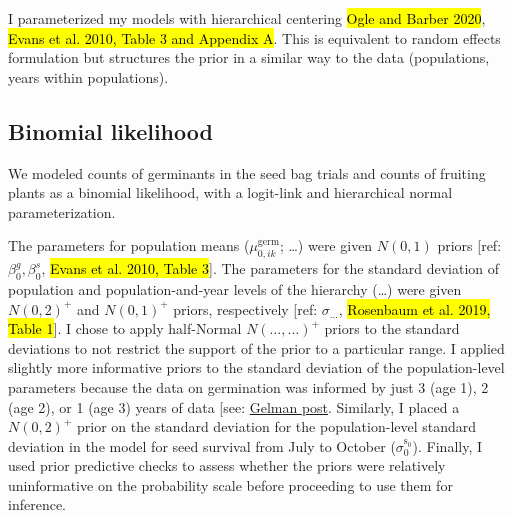 \documentclass[12pt, oneside, titlepage]{article}   	%
\begin{document}
I parameterized my models with hierarchical centering \hl{Ogle and Barber 2020}, \hl{Evans et al. 2010, Table 3 and Appendix A}. This is equivalent to random effects formulation but structures the prior in a similar way to the data (populations, years within populations).


\subsection*{Binomial likelihood}

We modeled counts of germinants in the seed bag trials and counts of fruiting plants as a binomial likelihood, with a logit-link and hierarchical normal parameterization. 

The parameters for population means ($\mu_{0,ik}^\mathrm{germ}$; \dots) were given $N(0,1)$ priors [ref: $\beta_0^g, \beta_0^s$, \hl{Evans et al. 2010, Table 3}]. The parameters for the standard deviation of population and population-and-year levels of the hierarchy (\dots) were given $N(0,2)^+$ and $N(0,1)^+$ priors, respectively [ref: $\sigma_{\dots}$, \hl{Rosenbaum et al. 2019, Table 1}]. I chose to apply half-Normal $N(\dots,\dots)^+$ priors to the standard deviations to not restrict the support of the prior to a particular range. I applied slightly more informative priors to the standard deviation of the population-level parameters because the data on germination was informed by just 3 (age 1), 2 (age 2), or 1 (age 3) years of data [see: \href{https://statmodeling.stat.columbia.edu/2015/12/08/hierarchical-modeling-when-you-have-only-2-groups-i-still-think-its-a-good-idea-you-just-need-an-informative-prior-on-the-group-level-variation/}{Gelman post}. Similarly, I placed a $N(0,2)^+$ prior on the standard deviation for the population-level standard deviation in the model for seed survival from July to October ($\sigma^\mathrm{s_0}_{0}$). Finally, I used prior predictive checks to assess whether the priors were relatively uninformative on the probability scale before proceeding to use them for inference. 

\end{document}
